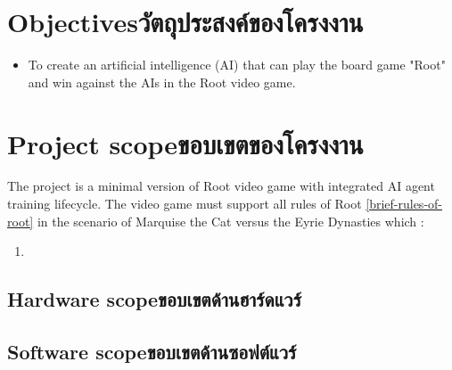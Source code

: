 


\section{\ifenglish Objectives\else วัตถุประสงค์ของโครงงาน\fi}
\begin{itemize}
    \item To create an artificial intelligence (AI) that can play the board game "Root" and win against the AIs in the Root video game.
\end{itemize}

\section{\ifenglish Project scope\else ขอบเขตของโครงงาน\fi}

The project is a minimal version of Root video game with integrated AI agent training lifecycle.
The video game must support all rules of Root \ref{brief-rules-of-root} in the scenario of Marquise the Cat versus the Eyrie Dynasties which :
\begin{enumerate}
    \item 
\end{enumerate}

\subsection{\ifenglish Hardware scope\else ขอบเขตด้านฮาร์ดแวร์\fi}

\subsection{\ifenglish Software scope\else ขอบเขตด้านซอฟต์แวร์\fi}

